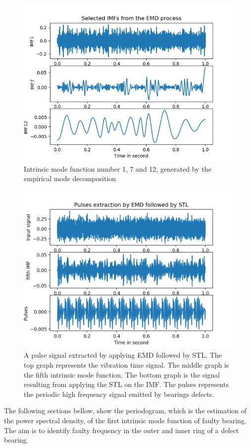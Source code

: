 \documentclass[../Main/thesis.tex]{subfiles}
\begin{document}
\begin{figure}[H] %
	\centering
	\includegraphics[width=6in]{../fig/selected_imf.png} 
	\caption{Intrinsic mode function number 1, 7 and 12, generated by the empirical mode decomposition}
	\label{fig:imf}
\end{figure}
\justify

\begin{figure}[H] %
   \centering
   \includegraphics[width=6in]{../fig/emd-stl.png} 
   \caption{ A pulse signal extracted by applying EMD followed by STL. The top graph represents the vibration time signal. The middle graph is the fifth intrinsic mode function. The bottom graph is the signal resulting from applying the STL on the IMF. The pulses represents the periodic high frequency signal emitted by bearings defects.}
   \label{fig:emd-stl}
\end{figure}
\justify
The following sections bellow, show the periodogram, which is the estimation of the power spectral density, of the first intrinsic mode function of faulty bearing. The aim is to identify faulty frequency in the outer and inner ring of a defect bearing.
\end{document}
